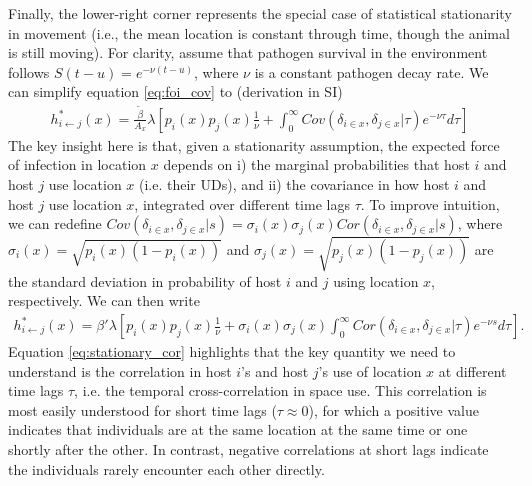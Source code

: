 \documentclass[letterpaper]{article}
\begin{document}
Finally, the lower-right corner represents the special case of statistical stationarity in movement (i.e., the mean location is constant through time, though the animal is still moving).
For clarity, assume that pathogen survival in the environment follows $S(t - u) = e^{-\nu (t - u)}$, where $\nu$ is a constant pathogen decay rate.  We  can simplify equation \ref{eq:foi_cov} to (derivation in SI)
\begin{equation}
    \begin{aligned}
   h^*_{i \leftarrow j}(x) = \frac{\tilde{\beta}}{A_x} \lambda \left[p_i(x)p_j(x) \frac{1}{\nu} + \int_{0}^{\infty} Cov(\delta_{i \in x}, \delta_{j \in x} | \tau) e^{-\nu \tau} d\tau\right]
    \end{aligned}
    \label{eq:foi_stationary}
\end{equation}
The key insight here is that, given a stationarity assumption, the expected force of infection in location $x$ depends on i) the marginal probabilities that host $i$ and host $j$ use location $x$ (i.e. their UDs), 
and ii) the covariance in how host $i$ and host $j$ use location $x$, integrated over different time lags $\tau$. 
To improve intuition, we can redefine $Cov(\delta_{i \in x}, \delta_{j \in x} | s) = \sigma_i(x) \sigma_j(x) Cor(\delta_{i \in x}, \delta_{j \in x} | s)$, where $\sigma_i(x) = \sqrt{p_i(x)(1 - p_i(x))}$  and $\sigma_j(x) = \sqrt{p_j(x)(1 - p_j(x))}$ are the standard deviation in probability of host $i$ and $j$ using location $x$, respectively.  We can then write
\begin{equation}
    \begin{aligned}
    h^*_{i \leftarrow j}(x) = \beta' \lambda \left[ p_i(x)p_j(x) \frac{1}{\nu} + \sigma_i(x) \sigma_j(x) \int_{0}^{\infty} Cor(\delta_{i \in x}, \delta_{j \in x} | \tau) e^{-\nu s} d\tau\right].
    \end{aligned}
    \label{eq:stationary_cor}
\end{equation}
Equation \ref{eq:stationary_cor} highlights that the key quantity we need to understand is the correlation in host $i$'s and host $j$'s use of location $x$ at different time lags $\tau$, i.e. the temporal cross-correlation in space use.
This correlation is most easily understood for short time lags ($\tau\approx0$), for which a positive value indicates that individuals are at the same location at the same time or one shortly after the other. In contrast, negative correlations at short lags indicate the individuals rarely encounter each other directly.
\end{document}
